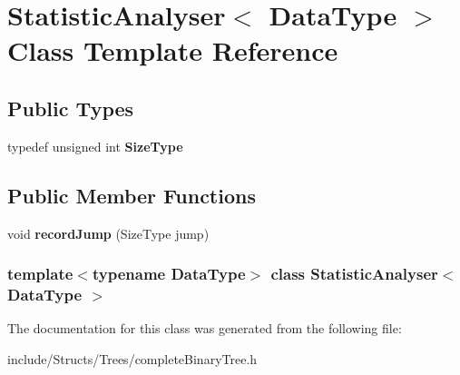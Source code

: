 \hypertarget{class_statistic_analyser}{
\section{StatisticAnalyser$<$ DataType $>$ Class Template Reference}
\label{class_statistic_analyser}
}
\subsection*{Public Types}
\begin{DoxyCompactItemize}
\item 
\hypertarget{class_statistic_analyser_a74cb8f9fe7b4c362529890a85ae04f3c}{
typedef unsigned int {\bfseries SizeType}}
\label{class_statistic_analyser_a74cb8f9fe7b4c362529890a85ae04f3c}

\end{DoxyCompactItemize}
\subsection*{Public Member Functions}
\begin{DoxyCompactItemize}
\item 
\hypertarget{class_statistic_analyser_a4a71d0bec73cc92ed24a2ed3008e7f89}{
void {\bfseries recordJump} (SizeType jump)}
\label{class_statistic_analyser_a4a71d0bec73cc92ed24a2ed3008e7f89}

\end{DoxyCompactItemize}
\subsubsection*{template$<$typename DataType$>$ class StatisticAnalyser$<$ DataType $>$}



The documentation for this class was generated from the following file:\begin{DoxyCompactItemize}
\item 
include/Structs/Trees/completeBinaryTree.h\end{DoxyCompactItemize}
